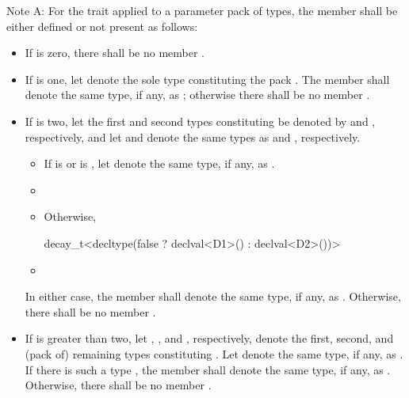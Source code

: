 
\pnum
Note A: For the  trait applied to a parameter pack
 of types, the member  shall be either defined or not
present as follows:

\begin{itemize}
\item If  is zero, there shall be no member .

\item If  is one, let  denote the sole type
constituting the pack .
The member   shall denote the same
type, if any, as ;
otherwise there shall be no member .

\item If  is two,
let the first and second types constituting  be denoted
by  and , respectively, and
let  and  denote
the same types as  and , respectively.
  \begin{itemize}
  \item If  is  or
      is ,
     let  denote the same type, if any, as .

  \item

  \item Otherwise,  
\begin{codeblock}
decay_t<decltype(false ? declval<D1>() : declval<D2>())>
\end{codeblock}

  \item {}
  \end{itemize}
In either case, the member   shall denote
the same type, if any, as .
Otherwise, there shall be no member .

\item If  is greater than two,
let , , and , respectively,
denote the first, second, and (pack of) remaining types constituting .
Let  denote the same type, if any, as .
If there is such a type , the member  
shall denote the same type, if any, as .
Otherwise, there shall be no member .
\end{itemize}

